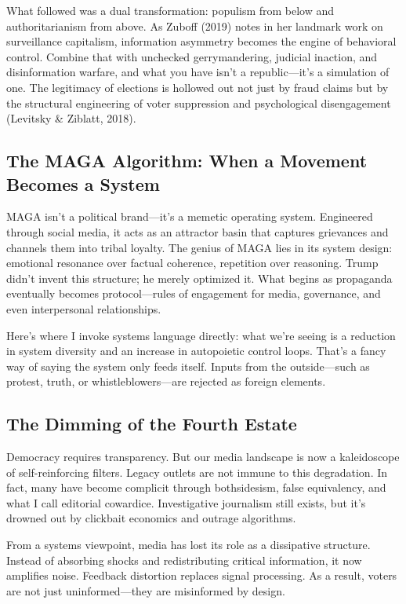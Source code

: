 \documentclass[
]{article}
\begin{document}
What followed was a dual transformation: populism from below and authoritarianism from above. As Zuboff (2019) notes in her landmark work on surveillance capitalism, information asymmetry becomes the engine of behavioral control. Combine that with unchecked gerrymandering, judicial inaction, and disinformation warfare, and what you have isn't a republic---it's a simulation of one. The legitimacy of elections is hollowed out not just by fraud claims but by the structural engineering of voter suppression and psychological disengagement (Levitsky \& Ziblatt, 2018).

\subsection{The MAGA Algorithm: When a Movement Becomes a System}\label{the-maga-algorithm-when-a-movement-becomes-a-system}

MAGA isn't a political brand---it's a memetic operating system. Engineered through social media, it acts as an attractor basin that captures grievances and channels them into tribal loyalty. The genius of MAGA lies in its system design: emotional resonance over factual coherence, repetition over reasoning. Trump didn't invent this structure; he merely optimized it. What begins as propaganda eventually becomes protocol---rules of engagement for media, governance, and even interpersonal relationships.

Here's where I invoke systems language directly: what we're seeing is a reduction in system diversity and an increase in autopoietic control loops. That's a fancy way of saying the system only feeds itself. Inputs from the outside---such as protest, truth, or whistleblowers---are rejected as foreign elements.

\subsection{The Dimming of the Fourth Estate}\label{the-dimming-of-the-fourth-estate}

Democracy requires transparency. But our media landscape is now a kaleidoscope of self-reinforcing filters. Legacy outlets are not immune to this degradation. In fact, many have become complicit through bothsidesism, false equivalency, and what I call editorial cowardice. Investigative journalism still exists, but it's drowned out by clickbait economics and outrage algorithms.

From a systems viewpoint, media has lost its role as a dissipative structure. Instead of absorbing shocks and redistributing critical information, it now amplifies noise. Feedback distortion replaces signal processing. As a result, voters are not just uninformed---they are misinformed by design.
\end{document}
